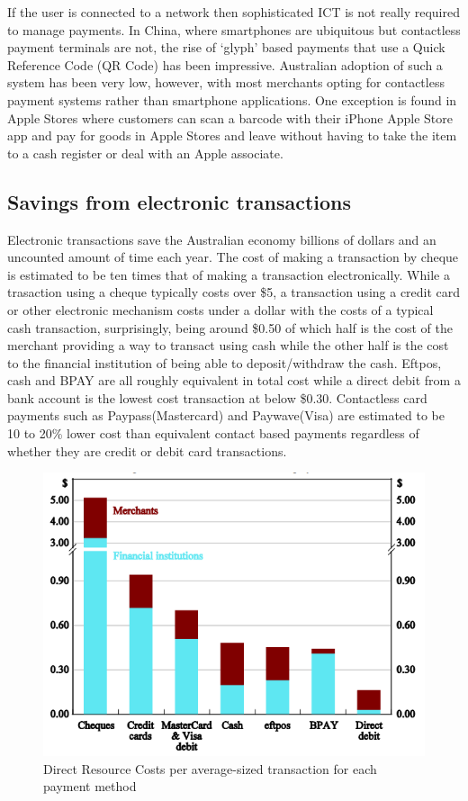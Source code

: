 If the user is connected to a network then sophisticated ICT is not really required to manage payments. In China, where smartphones are ubiquitous but contactless payment terminals are not, the rise of `glyph' based payments that use a Quick Reference Code (QR Code) has been impressive.\cite{RefWorks:266} Australian adoption of such a system has been very low, however, with most merchants opting for contactless payment systems rather than smartphone applications. One exception is found in Apple Stores where customers can scan a barcode with their iPhone Apple Store app and pay for goods in Apple Stores and leave without having to take the item to a cash register or deal with an Apple associate\cite[p6]{RefWorks:273}.

\subsection{Savings from electronic transactions}
Electronic transactions save the Australian economy billions of dollars and an uncounted amount of time each year. The cost of making a transaction by cheque is estimated to be ten times that of making a transaction electronically\cite{RefWorks:272}. While a trasaction using a cheque typically costs over \$5, a transaction using a credit card or other electronic mechanism costs under a dollar with the costs of a typical cash transaction, surprisingly, being around \$0.50 of which half is the cost of the merchant providing a way to transact using cash while the other half is the cost to the financial institution of being able to deposit/withdraw the cash. Eftpos, cash and BPAY are all roughly equivalent in total cost while a direct debit from a bank account is the lowest cost transaction at below \$0.30. Contactless card payments such as Paypass(Mastercard) and Paywave(Visa) are estimated to be 10 to 20\% lower cost than equivalent contact based payments regardless of whether they are credit or debit card transactions\cite{RefWorks:271}.

\begin{figure}
\includegraphics{figures/DirectResourceCosts.png}
\caption{Direct Resource Costs per average-sized transaction for each payment method\cite{RefWorks:271}}
\end{figure}

